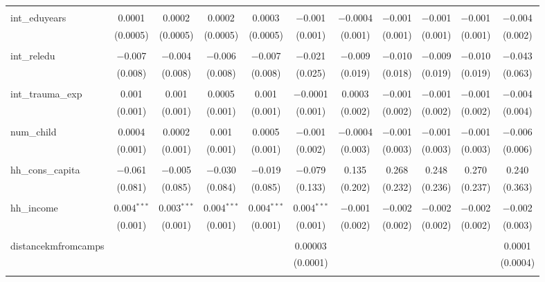 \begin{table}[H]
\begin{tabular}{@{\extracolsep{4pt}}lcccccccccc}
  & & & & & & & & & & \\ 
 int\_eduyears & 0.0001 & 0.0002 & 0.0002 & 0.0003 & $-$0.001 & $-$0.0004 & $-$0.001 & $-$0.001 & $-$0.001 & $-$0.004 \\ 
  & (0.0005) & (0.0005) & (0.0005) & (0.0005) & (0.001) & (0.001) & (0.001) & (0.001) & (0.001) & (0.002) \\ 
  & & & & & & & & & & \\ 
 int\_reledu & $-$0.007 & $-$0.004 & $-$0.006 & $-$0.007 & $-$0.021 & $-$0.009 & $-$0.010 & $-$0.009 & $-$0.010 & $-$0.043 \\ 
  & (0.008) & (0.008) & (0.008) & (0.008) & (0.025) & (0.019) & (0.018) & (0.019) & (0.019) & (0.063) \\ 
  & & & & & & & & & & \\ 
 int\_trauma\_exp & 0.001 & 0.001 & 0.0005 & 0.001 & $-$0.0001 & 0.0003 & $-$0.001 & $-$0.001 & $-$0.001 & $-$0.004 \\ 
  & (0.001) & (0.001) & (0.001) & (0.001) & (0.001) & (0.002) & (0.002) & (0.002) & (0.002) & (0.004) \\ 
  & & & & & & & & & & \\ 
 num\_child & 0.0004 & 0.0002 & 0.001 & 0.0005 & $-$0.001 & $-$0.0004 & $-$0.001 & $-$0.001 & $-$0.001 & $-$0.006 \\ 
  & (0.001) & (0.001) & (0.001) & (0.001) & (0.002) & (0.003) & (0.003) & (0.003) & (0.003) & (0.006) \\ 
  & & & & & & & & & & \\ 
 hh\_cons\_capita & $-$0.061 & $-$0.005 & $-$0.030 & $-$0.019 & $-$0.079 & 0.135 & 0.268 & 0.248 & 0.270 & 0.240 \\ 
  & (0.081) & (0.085) & (0.084) & (0.085) & (0.133) & (0.202) & (0.232) & (0.236) & (0.237) & (0.363) \\ 
  & & & & & & & & & & \\ 
 hh\_income & 0.004$^{***}$ & 0.003$^{***}$ & 0.004$^{***}$ & 0.004$^{***}$ & 0.004$^{***}$ & $-$0.001 & $-$0.002 & $-$0.002 & $-$0.002 & $-$0.002 \\ 
  & (0.001) & (0.001) & (0.001) & (0.001) & (0.001) & (0.002) & (0.002) & (0.002) & (0.002) & (0.003) \\ 
  & & & & & & & & & & \\ 
 distancekmfromcamps &  &  &  &  & 0.00003 &  &  &  &  & 0.0001 \\ 
  &  &  &  &  & (0.0001) &  &  &  &  & (0.0004) \\ 
  & & & & & & & & & & \\ 

\end{tabular}
\end{table}
